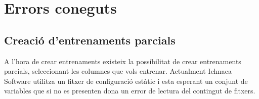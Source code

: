 \section{Errors coneguts}
\label{sec:errorsKnown}
\subsection*{Creació d'entrenaments parcials}
A l'hora de crear entrenaments existeix la possibilitat de crear entrenaments parcials, seleccionant les columnes que vols entrenar. Actualment Ichnaea Software utilitza un fitxer de configuració estàtic i esta esperant un conjunt de variables que si no es presenten dona un error de lectura del contingut de fitxers.
\subsection*{}
